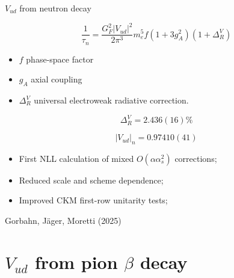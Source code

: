 \documentclass[11pt]{beamer}
\begin{document}
\begin{frame}{$V_{ud}$ from neutron decay}

\[
\frac{1}{\tau_n}
=
\frac{G_F^2 |V_{ud}|^2}{2\pi^3}
m_e^5 f (1+3g_A^2)(1+\Delta_R^V)
\]

\begin{itemize}
    \item $f$ phase-space factor
    \item $g_A$ axial coupling
    \item $\Delta_R^V$ universal electroweak radiative correction.
\end{itemize}

\[
\Delta_R^V = 2.436(16)\%
\]

\[
|V_{ud}|_n = 0.97410(41)
\]

\begin{itemize}
    \item First NLL calculation of mixed $O(\alpha\alpha_s^2)$ corrections;
    \item Reduced scale and scheme dependence;
    \item Improved CKM first-row unitarity tests;
\end{itemize}
{\footnotesize
Gorbahn, Jäger, Moretti (2025)
}
\end{frame}









\section{$V_{ud}$ from pion $\beta$ decay}
\end{document}

